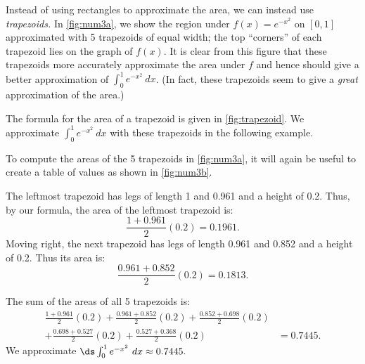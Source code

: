 Instead of using rectangles to approximate the area, we can instead use \textit{trapezoids.} In \autoref{fig:num3a}, we show the region under $f(x) = e^{-x^2}$ on $[0,1]$ approximated with 5 trapezoids of equal width; the top ``corners'' of each trapezoid lies on the graph of $f(x)$. It is clear from this figure that these trapezoids more accurately approximate the area under $f$ and hence should give a better approximation of $\int_0^1 e^{-x^2}\ dx$. (In fact, these trapezoids seem to give a \textit{great} approximation of the area.)



The formula for the area of a trapezoid is given in \autoref{fig:trapezoid}. We approximate $\int_0^1 e^{-x^2}\ dx$ with these trapezoids in the following example.

{To compute the areas of the 5 trapezoids in \autoref{fig:num3a}, it will again be useful to create a table of values as shown in \autoref{fig:num3b}.


The leftmost trapezoid has legs of length 1 and 0.961 and a height of 0.2. Thus, by our formula, the area of the leftmost trapezoid is:
\[\frac{1+0.961}{2}(0.2) = 0.1961.\]
Moving right, the next trapezoid has legs of length 0.961 and 0.852 and a height of 0.2. Thus its area is:
\[\frac{0.961+0.852}2(0.2) = 0.1813.\]

The sum of the areas of all 5 trapezoids is:
\begin{align*}
\frac{1+0.961}{2}(0.2) + \frac{0.961+0.852}2(0.2)+\frac{0.852+0.698}2(0.2)& \\
+\frac{0.698+0.527}2(0.2)+\frac{0.527+0.368}2(0.2)&= 0.7445.
\end{align*}
We approximate $\ds \int_0^1 e^{-x^2}\ dx \approx 0.7445.$}

